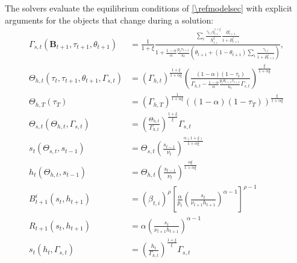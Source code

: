 The solvers evaluate the equilibrium conditions of \cref{\refmodelsec} with explicit arguments for the objects that change during a solution:
\begin{subequations}\label{\refeq:auxiliary}
    \begin{align}
        \Gamma_{s,t}\left(\bm{B}_{t+1}, \tau_{t+1}, \theta_{t+1} \right) &= \frac{1}{1+\xi}\frac{\sum_i \frac{\gamma_{t,i}\eta_{t,i}^{1+\xi}}{X_{t,i}^{\xi}}\frac{B_{t+1}^i}{1+B_{t+1}^i}}{1+\frac{1-\alpha}{\alpha}\frac{p_t\tau_{t+1}}{\kappa_t}\left(\theta_{t+1}+(1-\theta_{t+1})\sum_i\frac{\gamma_{t,i}}{1+B_{t+1}^i}\right)},
        \label{\refeq:auxiliary:Gammas} \\
        \Theta_{h,t}\left(\tau_t, \tau_{t+1}, \theta_{t+1}, \Gamma_{s,t}\right) &= \left(\Gamma_{h,t}\right)^{\frac{1+\xi}{1+\alpha\xi}}\left(\frac{(1-\alpha)(1-\tau_t)}{\Gamma_{h,t}-\frac{1-\alpha}{\alpha}\frac{p_t\theta_{t+1}\tau_{t+1}}{\kappa_t}\Gamma_{s,t}}\right)^{\frac{\xi}{1+\alpha\xi}}
        \label{\refeq:auxiliary:Thetah} \\
        \Theta_{h,T}\left(\tau_T\right) &= \left(\Gamma_{h,T}\right)^{\frac{1}{1+\alpha\xi}}\left((1-\alpha)(1-\tau_T)\right)^{\frac{\xi}{1+\alpha\xi}}
        \label{\refeq:auxiliary:ThetahT} \\
        \Theta_{s,t}\left(\Theta_{h,t}, \Gamma_{s,t}\right) &= \left(\frac{\Theta_{h,t}}{\Gamma_{h,t}}\right)^{\frac{1+\xi}{\xi}} \Gamma_{s,t}
        \label{\refeq:auxiliary:Thetas} \\
        s_t(\Theta_{s,t}, s_{t-1}) &= \Theta_{s,t} \left(\frac{s_{t-1}}{\nu_t}\right)^{\frac{\alpha(1+\xi)}{1+\alpha\xi}}
        \label{\refeq:auxiliary:s} \\
        h_t\left(\Theta_{h,t}, s_{t-1}\right) &= \Theta_{h,t}\left(\frac{s_{t-1}}{\nu_t}\right)^{\frac{\alpha\xi}{1+\alpha\xi}} \label{\refeq:auxiliary:h} \\
        B_{t+1}^i\left(s_t, h_{t+1}\right) &=\left(\beta_{t,i}\right)^{\rho}\left[\frac{\alpha}{p_t}\left(\frac{s_t}{\nu_{t+1}h_{t+1}}\right)^{\alpha-1}\right]^{\rho-1}
        \label{\refeq:auxiliary:B} \\
        R_{t+1}\left(s_t, h_{t+1}\right) &= \alpha \left(\frac{s_t}{\nu_{t+1}h_{t+1}}\right)^{\alpha-1} \label{\refeq:auxiliary:R} \\
        s_t\left(h_t, \Gamma_{s,t}\right) &= \left(\frac{h_t}{\Gamma_{h,t}}\right)^{\frac{1+\xi}{\xi}}\Gamma_{s,t}
        \label{\refeq:auxiliary:sFromH}
    \end{align}
\end{subequations}







